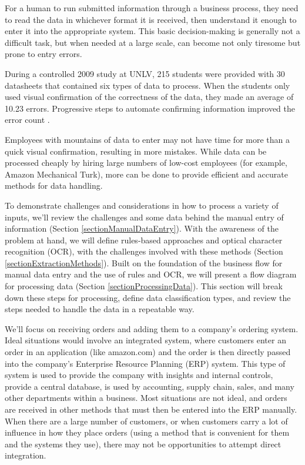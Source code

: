 \documentclass[conference]{IEEEtran}
\begin{document}
For a human to run submitted information through a business process, they need to read the data in whichever format it is received, then understand it enough to enter it into the appropriate system. This basic decision-making is generally not a difficult task, but when needed at a large scale, can become not only tiresome but prone to entry errors. 

During a controlled 2009 study at UNLV, 215 students were provided with 30 datasheets that contained six types of data to process. When the students only used visual confirmation of the correctness of the data, they made an average of 10.23 errors. Progressive steps to automate confirming information improved the error count \cite{harris2014when}.

Employees with mountains of data to enter may not have time for more than a quick visual confirmation, resulting in more mistakes. While data can be processed cheaply by hiring large numbers of low-cost employees (for example, Amazon Mechanical Turk), more can be done to provide efficient and accurate methods for data handling.

To demonstrate challenges and considerations in how to process a variety of inputs, we'll review the challenges and some data behind the manual entry of information (Section \ref{sectionManualDataEntry}). With the awareness of the problem at hand, we will define rules-based approaches and optical character recognition (OCR), with the challenges involved with these methods (Section \ref{sectionExtractionMethods}). Built on the foundation of the business flow for manual data entry and the use of rules and OCR, we will present a flow diagram for processing data (Section \ref{sectionProcessingData}). This section will break down these steps for processing, define data classification types, and review the steps needed to handle the data in a repeatable way.

We'll focus on receiving orders and adding them to a company's ordering system. Ideal situations would involve an integrated system, where customers enter an order in an application (like amazon.com) and the order is then directly passed into the company's Enterprise Resource Planning (ERP) system. This type of system is used to provide the company with insights and internal controls, provide a central database, is used by accounting, supply chain, sales, and many other departments within a business. Most situations are not ideal, and orders are received in other methods that must then be entered into the ERP manually. When there are a large number of customers, or when customers carry a lot of influence in how they place orders (using a method that is convenient for them and the systems they use), there may not be opportunities to attempt direct integration.
\end{document}

